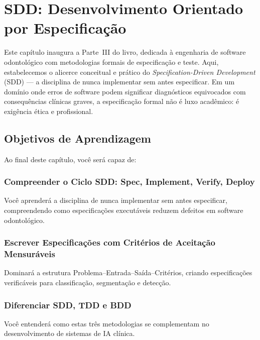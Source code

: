 \chapter{SDD: Desenvolvimento Orientado por Especificação}
\label{cap:sdd-metodologia}
\niveltres

Este capítulo inaugura a Parte~III do livro, dedicada à engenharia de
software odontológico com metodologias formais de especificação e teste.
Aqui, estabelecemos o alicerce conceitual e prático do
\textit{Specification-Driven Development} (SDD) — a disciplina de nunca
implementar sem antes especificar. Em um domínio onde erros de software
podem significar diagnósticos equivocados com consequências clínicas
graves, a especificação formal não é luxo acadêmico: é exigência
ética e profissional.

\section{Objetivos de Aprendizagem}

Ao final deste capítulo, você será capaz de:

\subsection{Compreender o Ciclo SDD: Spec, Implement, Verify, Deploy}
Você aprenderá a disciplina de nunca implementar sem antes especificar, compreendendo como especificações executáveis reduzem defeitos em software odontológico.

\subsection{Escrever Especificações com Critérios de Aceitação Mensuráveis}
Dominará a estrutura Problema--Entrada--Saída--Critérios, criando especificações verificáveis para classificação, segmentação e detecção.

\subsection{Diferenciar SDD, TDD e BDD}
Você entenderá como estas três metodologias se complementam no desenvolvimento de sistemas de IA clínica.

